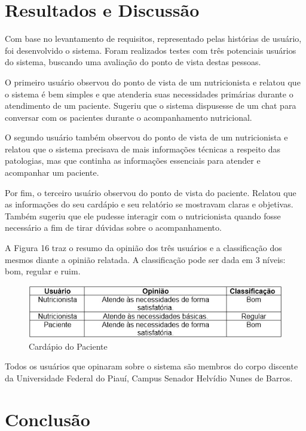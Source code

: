 \documentclass[
	12pt,				%
    oneside,			%
	a4paper,			%
	english,			%
	french,				%
	spanish,			%
	brazil,				%
	]{abntex2}
\begin{document}
\chapter{Resultados e Discussão}

Com base no levantamento de requisitos, representado pelas histórias de usuário, foi desenvolvido o sistema. Foram realizados testes com três potenciais usuários do sistema, buscando uma avaliação do ponto de vista destas pessoas.

O primeiro usuário observou do ponto de vista de um nutricionista e relatou que o sistema é bem simples e que atenderia suas necessidades primárias durante o atendimento de um paciente. Sugeriu que o sistema dispusesse de um chat para conversar com os pacientes durante o acompanhamento nutricional.

O segundo usuário também observou do ponto de vista de um nutricionista e relatou que o sistema precisava de mais informações técnicas a respeito das patologias, mas que continha as informações essenciais para atender e acompanhar um paciente.

Por fim, o terceiro usuário observou do ponto de vista do paciente. Relatou que as informações do seu cardápio e seu relatório se mostravam claras e objetivas. Também sugeriu que ele pudesse interagir com o nutricionista quando fosse necessário a fim de tirar dúvidas sobre o acompanhamento.

A Figura 16 traz o resumo da opinião dos três usuários e a classificação dos mesmos diante a opinião relatada. A classificação pode ser dada em 3 níveis: bom, regular e ruim.

\begin{figure} [hbt]
\label{cardPac} 
\caption{Cardápio do Paciente}
\begin{center}
\includegraphics[width=1.0\textwidth]{table4.jpg}
\end{center}
\end{figure}

Todos os usuários que opinaram sobre o sistema são membros do corpo discente da Universidade Federal do Piauí, Campus Senador Helvídio Nunes de Barros.

\chapter{Conclusão}
\end{document}
